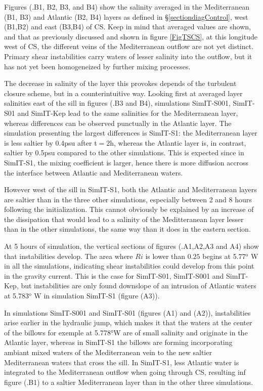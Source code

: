 Figures (.B1, B2, B3, and B4) show the salinity averaged in the Mediterranean (B1, B3) and Atlantic (B2, B4) layers as defined in \S \ref{sectiondiagControl}, west (B1,B2) and east (B3,B4) of CS. Keep in mind that averaged values are shown, and that as previously discussed and shown in figure \ref{FigTSCS}, at this longitude west of CS, the different veins of the Mediterranean outflow are not yet distinct. Primary shear instabilities carry waters of lesser salinity into the outflow, but it has not yet been homogeneized by further mixing processes.

The decrease in salinity of the layer this provokes depends of the turbulent closure scheme, but in a counterintuitive way. Looking first at averaged layer salinities east of the sill in figures (.B3 and B4), simulations SimIT-S001, SimIT-S01 and SimIT-Kep lead to the same salinities for the Mediterranean layer, whereas differences can be observed punctually in the Atlantic layer. The simulation presenting the largest differences is SimIT-S1: the Mediterranean layer is less saltier by 0.4psu after t$=$2h, whereas the Atlantic layer is, in contrast, saltier by 0.5psu compared to the other simulations. This is expected since in SimIT-S1, the mixing coefficient is larger, hence there is more diffusion accross the interface between Atlantic and Mediterranean waters.

However west of the sill in SimIT-S1, both the Atlantic and Mediterranean layers are saltier than in the three other simulations, especially between 2 and 8 hours following the initialization. This cannot obviously be explained by an increase of the dissipation that would lead to a salinity of the Meditteranean layer lesser than in the other simulations, the same way than it does in the eastern section.

At 5 hours of simulation, the vertical sections of figures (.A1,A2,A3 and A4) show that instabilities develop. The area where $Ri$ is lower than $0.25$ begins at 5.77$^\text{o}$ W in all the simulations, indicating shear instabilities could develop from this point in the gravity current. This is the case for SimIT-S01, SimIT-S001 and SimIT-Kep, but instabilities are only found downslope of an intrusion of Atlantic waters at 5.783$^\text{o}$ W in simulation SimIT-S1 (figure (A3)).

In simulations SimIT-S001 and SimIT-S01 (figures (A1) and (A2)), instabilities arise earlier in the hydraulic jump, which makes it that the waters at the center of the billows for exemple at 5.778°W are of small salinity and originate in the Atlantic layer, whereas in SimIT-S1 the billows are forming incorporating ambiant mixed waters of the Mediterranean vein to the new saltier Mediterranean waters that cross the sill. In SimIT-S1, less Atlantic water is integrated to the Mediterranean outflow when going through CS, resulting inf figure (.B1) to a saltier Mediterranean layer than in the other three simulations.
 
